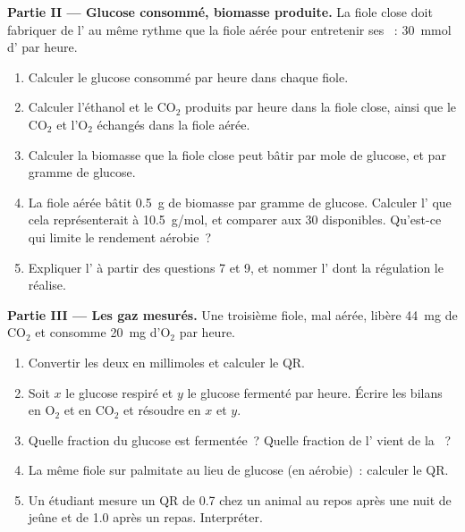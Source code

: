 \begin{problem}
\medskip
\noindent\textbf{Partie II --- Glucose consommé, biomasse produite.}
La fiole close doit fabriquer de l' au même rythme que la fiole aérée
pour entretenir ses ~: \qty{30}{mmol} d' par heure.
\begin{enumerate}[resume]
  \item Calculer le glucose consommé par heure dans chaque fiole.
  \item Calculer l'éthanol et le $\mathrm{CO_2}$ produits par heure dans
        la fiole close, ainsi que le $\mathrm{CO_2}$ et l'$\mathrm{O_2}$
        échangés dans la fiole aérée.
  \item Calculer la biomasse que la fiole close peut bâtir par mole de
        glucose, et par gramme de glucose.
  \item La fiole aérée bâtit \qty{0.5}{g} de biomasse par gramme de
        glucose. Calculer l' que cela représenterait à
        \qty{10.5}{g/mol}, et comparer aux 30  disponibles. Qu'est-ce
        qui limite le rendement aérobie~?
  \item Expliquer l' à partir des questions 7 et 9, et
        nommer l' dont la régulation le réalise.
\end{enumerate}

\medskip
\noindent\textbf{Partie III --- Les gaz mesurés.}
Une troisième fiole, mal aérée, libère \qty{44}{mg} de $\mathrm{CO_2}$
et consomme \qty{20}{mg} d'$\mathrm{O_2}$ par heure.
\begin{enumerate}[resume]
  \item Convertir les deux en millimoles et calculer le QR.
  \item Soit $x$ le glucose respiré et $y$ le glucose fermenté par
        heure. Écrire les bilans en $\mathrm{O_2}$ et en
        $\mathrm{CO_2}$ et résoudre en $x$ et $y$.
  \item Quelle fraction du glucose est fermentée~? Quelle fraction de
        l' vient de la ~?
  \item La même fiole sur palmitate au lieu de glucose (en aérobie)~:
        calculer le QR.
  \item Un étudiant mesure un QR de 0.7 chez un animal au repos après
        une nuit de jeûne et de 1.0 après un repas. Interpréter.
\end{enumerate}


\end{problem}
